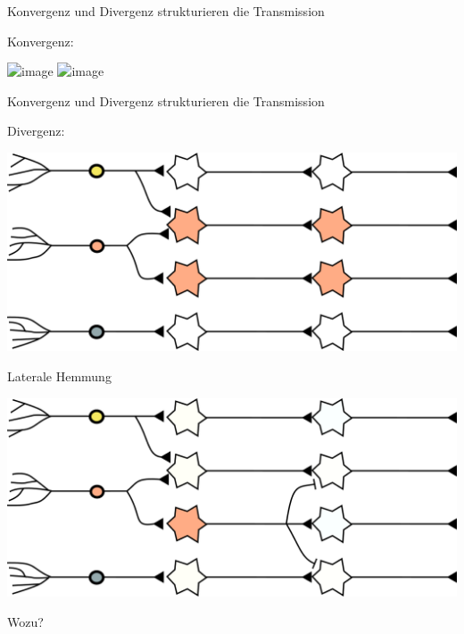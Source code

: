 \documentclass{beamer}
\begin{document}
\begin{frame}{Konvergenz und Divergenz strukturieren die Transmission}

Konvergenz:

\begin{center}
    \includegraphics<1>[width=\textwidth]{konvergenz_1.png}
    \includegraphics<2>[width=\textwidth]{konvergenz_2.png}
\end{center}


\end{frame}



\begin{frame}{Konvergenz und Divergenz strukturieren die Transmission}

Divergenz:

\begin{center}
    \includegraphics[width=\textwidth]{divergenz.png}
\end{center}


\end{frame}


\begin{frame}{Laterale Hemmung}

\begin{center}
    \includegraphics[width=\textwidth]{lateral_inhibition_detail.png}
\end{center}

Wozu?

\end{frame}
\end{document}
